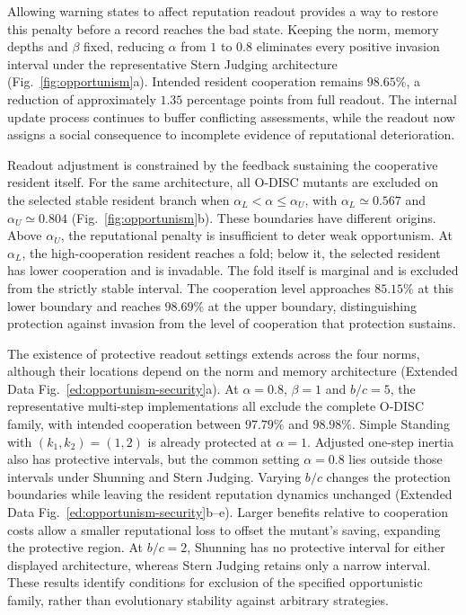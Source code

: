 \documentclass[fleqn,10pt]{article}
\begin{document}
Allowing warning states to affect reputation readout provides a way to restore this penalty before a record reaches the bad state. Keeping the norm, memory depths and $\beta$ fixed, reducing $\alpha$ from $1$ to $0.8$ eliminates every positive invasion interval under the representative Stern Judging architecture (Fig.~\ref{fig:opportunism}a). Intended resident cooperation remains $98.65\%$, a reduction of approximately $1.35$ percentage points from full readout. The internal update process continues to buffer conflicting assessments, while the readout now assigns a social consequence to incomplete evidence of reputational deterioration.

Readout adjustment is constrained by the feedback sustaining the cooperative resident itself. For the same architecture, all O-DISC mutants are excluded on the selected stable resident branch when $\alpha_L<\alpha\leq\alpha_U$, with $\alpha_L\simeq0.567$ and $\alpha_U\simeq0.804$ (Fig.~\ref{fig:opportunism}b). These boundaries have different origins. Above $\alpha_U$, the reputational penalty is insufficient to deter weak opportunism. At $\alpha_L$, the high-cooperation resident reaches a fold; below it, the selected resident has lower cooperation and is invadable. The fold itself is marginal and is excluded from the strictly stable interval. The cooperation level approaches $85.15\%$ at this lower boundary and reaches $98.69\%$ at the upper boundary, distinguishing protection against invasion from the level of cooperation that protection sustains.

The existence of protective readout settings extends across the four norms, although their locations depend on the norm and memory architecture (Extended Data Fig.~\ref{ed:opportunism-security}a). At $\alpha=0.8$, $\beta=1$ and $b/c=5$, the representative multi-step implementations all exclude the complete O-DISC family, with intended cooperation between $97.79\%$ and $98.98\%$. Simple Standing with $(k_1,k_2)=(1,2)$ is already protected at $\alpha=1$. Adjusted one-step inertia also has protective intervals, but the common setting $\alpha=0.8$ lies outside those intervals under Shunning and Stern Judging. Varying $b/c$ changes the protection boundaries while leaving the resident reputation dynamics unchanged (Extended Data Fig.~\ref{ed:opportunism-security}b--e). Larger benefits relative to cooperation costs allow a smaller reputational loss to offset the mutant's saving, expanding the protective region. At $b/c=2$, Shunning has no protective interval for either displayed architecture, whereas Stern Judging retains only a narrow interval. These results identify conditions for exclusion of the specified opportunistic family, rather than evolutionary stability against arbitrary strategies.
\end{document}
